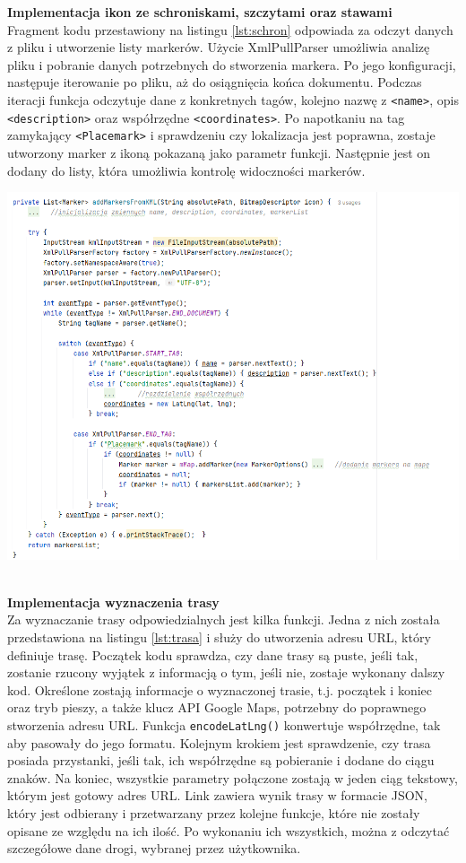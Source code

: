 \textbf{Implementacja ikon ze schroniskami, szczytami oraz stawami} \\ 
Fragment kodu przestawiony na listingu \ref{lst:schron} odpowiada za odczyt danych z pliku i utworzenie listy markerów. Użycie XmlPullParser umożliwia analizę pliku i pobranie danych potrzebnych do stworzenia markera. Po jego konfiguracji, następuje iterowanie po pliku, aż do osiągnięcia końca dokumentu. Podczas iteracji funkcja odczytuje dane z konkretnych tagów, kolejno nazwę z \verb|<name>|, opis \verb|<description>| oraz współrzędne \verb|<coordinates>|. Po napotkaniu na tag zamykający \verb|<Placemark>| i sprawdzeniu czy lokalizacja jest poprawna, zostaje utworzony marker z ikoną pokazaną jako parametr funkcji. Następnie jest on dodany do listy, która umożliwia kontrolę widoczności markerów. \\

\noindent
\setlength{\fboxrule}{0.5pt}
\begin{minipage}{\linewidth}
    \label{lst:schron}
    \centering
    \includegraphics[width=0.6\linewidth]{img/kod/schroniska.png}
\end{minipage}\\


\textbf{Implementacja wyznaczenia trasy}\\

Za wyznaczanie trasy odpowiedzialnych jest kilka funkcji. Jedna z nich została przedstawiona na listingu \ref{lst:trasa} i służy do utworzenia adresu URL, który definiuje trasę. Początek kodu sprawdza, czy dane trasy są puste, jeśli tak, zostanie rzucony wyjątek z informacją o tym, jeśli nie, zostaje wykonany dalszy kod. Określone zostają informacje o wyznaczonej trasie, t.j. początek i koniec oraz tryb pieszy, a także klucz API Google Maps, potrzebny do poprawnego stworzenia adresu URL. Funkcja \verb|encodeLatLng()| konwertuje współrzędne, tak aby pasowały do jego formatu. Kolejnym krokiem jest sprawdzenie, czy trasa posiada przystanki, jeśli tak, ich współrzędne są pobieranie i dodane do ciągu znaków. Na koniec, wszystkie parametry połączone zostają w jeden ciąg tekstowy, którym jest gotowy adres URL. Link zawiera wynik trasy w formacie JSON, który jest odbierany i przetwarzany przez kolejne funkcje, które nie zostały opisane ze względu na ich ilość. Po wykonaniu ich wszystkich, można z odczytać szczegółowe dane drogi, wybranej przez użytkownika. \\

